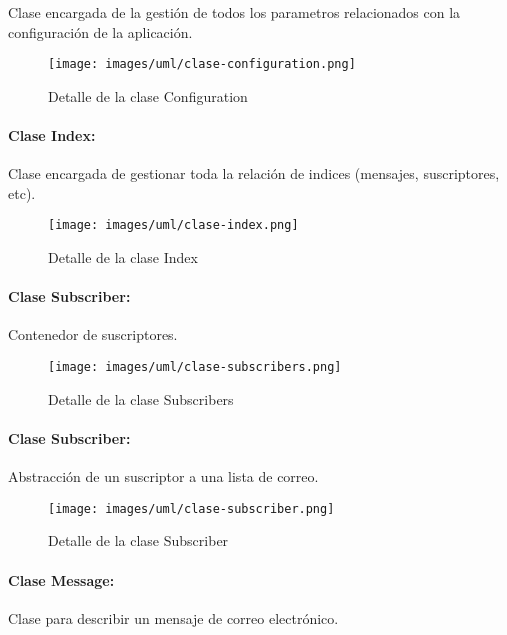 Clase encargada de la gestión de todos los parametros relacionados con la
configuración de la aplicación.

\begin{figure}[H]
	\centering
 	\texttt{[image: images/uml/clase-configuration.png]}
	\caption{Detalle de la clase Configuration}
	\label{fig:uml:configuration-class}
\end{figure}

\paragraph{Clase Index:}

Clase encargada de gestionar toda la relación de indices (mensajes, suscriptores,
etc).

\begin{figure}[H]
	\centering
 	\texttt{[image: images/uml/clase-index.png]}
	\caption{Detalle de la clase Index}
	\label{fig:uml:index-class}
\end{figure}

\paragraph{Clase Subscriber:}

Contenedor de suscriptores.

\begin{figure}[H]
	\centering
 	\texttt{[image: images/uml/clase-subscribers.png]}
	\caption{Detalle de la clase Subscribers}
	\label{fig:uml:subscribers-class}
\end{figure}

\paragraph{Clase Subscriber:}

Abstracción de un suscriptor a una lista de correo.

\begin{figure}[H]
	\centering
 	\texttt{[image: images/uml/clase-subscriber.png]}
	\caption{Detalle de la clase Subscriber}
	\label{fig:uml:subscriber-class}
\end{figure}

\paragraph{Clase Message:}

Clase para describir un mensaje de correo electrónico.

